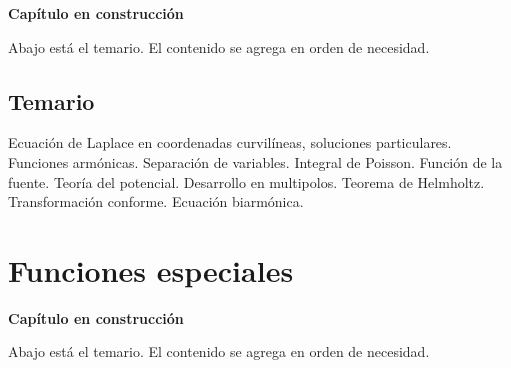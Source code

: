 \documentclass[
  spanish,
  a4paper,
]{scrbook}
\theoremstyle{definition}
\theoremstyle{plain}
\theoremstyle{definition}
\theoremstyle{plain}
\theoremstyle{definition}
\theoremstyle{remark}
\begin{document}
\begin{tcolorbox}[enhanced jigsaw, arc=.35mm, bottomrule=.15mm, breakable, colback=white, colframe=quarto-callout-note-color-frame, left=2mm, leftrule=.75mm, opacityback=0, rightrule=.15mm, toprule=.15mm]
\begin{minipage}[t]{5.5mm}
\textcolor{quarto-callout-note-color}{\faInfo}
\end{minipage}%
\begin{minipage}[t]{\textwidth - 5.5mm}

\vspace{-3mm}\textbf{Capítulo en construcción}\vspace{3mm}

Abajo está el temario. El contenido se agrega en orden de necesidad.

\end{minipage}%
\end{tcolorbox}

\section*{Temario}\label{temario-8}


Ecuación de Laplace en coordenadas curvilíneas, soluciones particulares.
Funciones armónicas. Separación de variables. Integral de Poisson.
Función de la fuente. Teoría del potencial. Desarrollo en multipolos.
Teorema de Helmholtz. Transformación conforme. Ecuación biarmónica.

\chapter{Funciones especiales}\label{sec-especiales}

\begin{tcolorbox}[enhanced jigsaw, arc=.35mm, bottomrule=.15mm, breakable, colback=white, colframe=quarto-callout-note-color-frame, left=2mm, leftrule=.75mm, opacityback=0, rightrule=.15mm, toprule=.15mm]
\begin{minipage}[t]{5.5mm}
\textcolor{quarto-callout-note-color}{\faInfo}
\end{minipage}%
\begin{minipage}[t]{\textwidth - 5.5mm}

\vspace{-3mm}\textbf{Capítulo en construcción}\vspace{3mm}

Abajo está el temario. El contenido se agrega en orden de necesidad.

\end{minipage}%
\end{tcolorbox}
\end{document}
